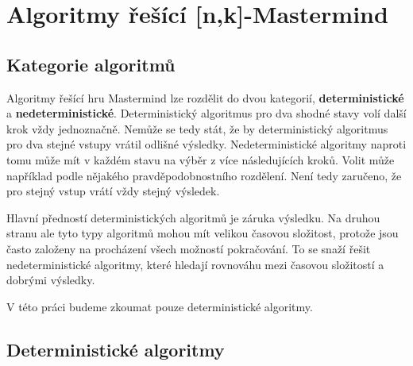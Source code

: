 \chapter{Algoritmy řešící [n,k]-Mastermind}

\section{Kategorie algoritmů}
Algoritmy řešící hru Mastermind lze rozdělit do dvou kategorií, \textbf{deterministické} a \textbf{nedeterministické}. Deterministický algoritmus pro dva shodné stavy volí další krok vždy jednoznačně. Nemůže se tedy stát, že by deterministický algoritmus pro dva stejné vstupy vrátil odlišné výsledky. Nedeterministické algoritmy naproti tomu může mít v každém stavu na výběr z více následujících kroků. Volit může například podle nějakého pravděpodobnostního rozdělení. Není tedy zaručeno, že pro stejný vstup vrátí vždy stejný výsledek.

Hlavní předností deterministických algoritmů je záruka výsledku. Na druhou stranu ale tyto typy algoritmů mohou mít velikou časovou složitost, protože jsou často založeny na procházení všech možností pokračování. To se snaží řešit nedeterministické algoritmy, které hledají rovnováhu mezi časovou složitostí a dobrými výsledky. 

V této práci budeme zkoumat pouze deterministické algoritmy. 



\section{Deterministické algoritmy}





